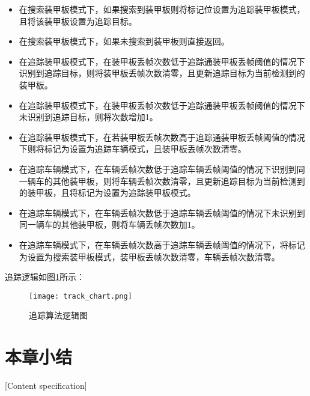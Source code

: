\begin{itemize}[itemindent=2em]
\item 在搜索装甲板模式下，如果搜索到装甲板则将标记位设置为追踪装甲板模式，且将该装甲板设置为追踪目标。
\item 在搜索装甲板模式下，如果未搜索到装甲板则直接返回。
\item 在追踪装甲板模式下，在装甲板丢帧次数低于追踪通装甲板丢帧阈值的情况下识别到追踪目标，则将装甲板丢帧次数清零，且更新追踪目标为当前检测到的装甲板。
\item 在追踪装甲板模式下，在装甲板丢帧次数低于追踪通装甲板丢帧阈值的情况下未识别到追踪目标，则将次数增加1。
\item 在追踪装甲板模式下，在若装甲板丢帧次数高于追踪通装甲板丢帧阈值的情况下则将标记为设置为追踪车辆模式，且装甲板丢帧次数清零。
\item 在追踪车辆模式下，在车辆丢帧次数低于追踪车辆丢帧阈值的情况下识别到同一辆车的其他装甲板，则将车辆丢帧次数清零，且更新追踪目标为当前检测到的装甲板，且将标记为设置为追踪装甲板模式。
\item 在追踪车辆模式下，在车辆丢帧次数低于追踪车辆丢帧阈值的情况下未识别到同一辆车的其他装甲板，则将车辆丢帧次数加1。
\item 在追踪车辆模式下，在车辆丢帧次数高于追踪车辆丢帧阈值的情况下，将标记为设置为搜索装甲板模式，装甲板丢帧次数清零，车辆丢帧次数清零。
\end{itemize}

追踪逻辑如图\ref{追踪算法逻辑图}所示：

\begin{figure}[H]
    \centering
    \texttt{[image: track\_chart.png]} 
    \caption{追踪算法逻辑图} 
    \label{追踪算法逻辑图} 
\end{figure} 

\par


\section{本章小结}[Content specification]


